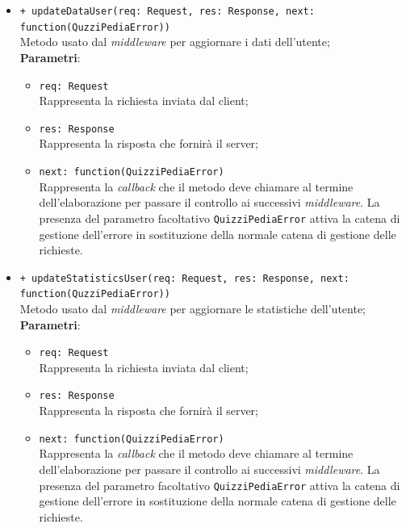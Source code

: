 \begin{itemize}
\begin{itemize}
\begin{itemize}
		 \end{itemize}
		\item
		\texttt{+ updateDataUser(req: Request, res: Response, next: function(QuzziPediaError))} \\
		Metodo usato dal \textit{middleware} per aggiornare i dati dell'utente; \\
		\textbf{Parametri}:
		 \begin{itemize}
		  \item
			\texttt{req: Request} \\
			Rappresenta la richiesta inviata dal client;
		  \item
			\texttt{res: Response} \\
			Rappresenta la risposta che fornirà il server;
		  \item
		    \texttt{next: function(QuizziPediaError)} \\
			Rappresenta la \textit{callback} che il metodo deve chiamare al termine dell'elaborazione per passare il controllo ai successivi \textit{middleware}. La presenza del parametro facoltativo \texttt{QuizziPediaError} attiva la catena di gestione dell'errore in sostituzione della normale catena di gestione delle richieste.
		 \end{itemize}
		 \item
		\texttt{+ updateStatisticsUser(req: Request, res: Response, next: \\function(QuzziPediaError))} \\
		Metodo usato dal \textit{middleware} per aggiornare le statistiche dell'utente; \\
		\textbf{Parametri}:
		 \begin{itemize}
		  \item
			\texttt{req: Request} \\
			Rappresenta la richiesta inviata dal client;
		  \item
			\texttt{res: Response} \\
			Rappresenta la risposta che fornirà il server;
		  \item
		    \texttt{next: function(QuizziPediaError)} \\
			Rappresenta la \textit{callback} che il metodo deve chiamare al termine dell'elaborazione per passare il controllo ai successivi \textit{middleware}. La presenza del parametro facoltativo \texttt{QuizziPediaError} attiva la catena di gestione dell'errore in sostituzione della normale catena di gestione delle richieste.
		 \end{itemize}

\end{itemize}
\end{itemize}
